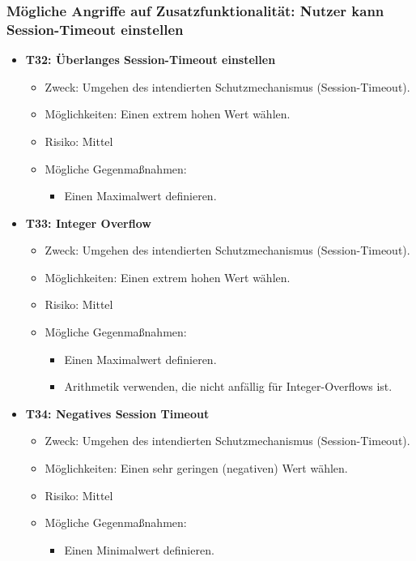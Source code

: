 \documentclass[12pt,DIV14,BCOR10mm,a4paper,parskip=half-,headsepline,headinclude,english,ngerman,bibliography=totocnumbered]{scrreprt}
\begin{document}
\subsubsection{Mögliche Angriffe auf Zusatzfunktionalität: Nutzer kann Session-Timeout einstellen}

\begin{itemize}

  \hypertarget{threat32}{}
  \item \textbf{T32: Überlanges Session-Timeout einstellen}
  \begin{itemize}
    \item Zweck: Umgehen des intendierten Schutzmechanismus (Session-Timeout).
    \item Möglichkeiten: Einen extrem hohen Wert wählen.
    \item Risiko: Mittel
    \item Mögliche Gegenmaßnahmen:
      \begin{itemize}
      \item Einen Maximalwert definieren.
      \end{itemize} 
  \end{itemize}

  \hypertarget{threat33}{}
  \item \textbf{T33: Integer Overflow}
  \begin{itemize}
    \item Zweck: Umgehen des intendierten Schutzmechanismus (Session-Timeout).
    \item Möglichkeiten: Einen extrem hohen Wert wählen.
    \item Risiko: Mittel
    \item Mögliche Gegenmaßnahmen:
      \begin{itemize}
      \item Einen Maximalwert definieren.
      \item Arithmetik verwenden, die nicht anfällig für Integer-Overflows ist.
      \end{itemize}
  \end{itemize}

  \hypertarget{threat34}{}
  \item \textbf{T34: Negatives Session Timeout}
  \begin{itemize}
    \item Zweck: Umgehen des intendierten Schutzmechanismus (Session-Timeout).
    \item Möglichkeiten: Einen sehr geringen (negativen) Wert wählen.
    \item Risiko: Mittel
    \item Mögliche Gegenmaßnahmen:
      \begin{itemize}
      \item Einen Minimalwert definieren.
      \end{itemize}
  \end{itemize}
\end{itemize}
\end{document}
